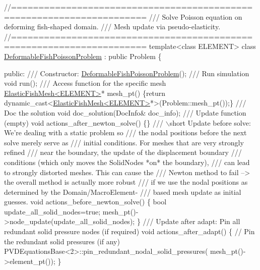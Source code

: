 \begin{DoxyCodeInclude}
\textcolor{comment}{//====================================================================== }\textcolor{comment}{}
\textcolor{comment}{/// Solve Poisson equation on deforming fish-shaped domain.}
\textcolor{comment}{/// Mesh update via pseudo-elasticity.}
\textcolor{comment}{}\textcolor{comment}{//====================================================================== }
\textcolor{keyword}{template}<\textcolor{keyword}{class} ELEMENT>
\textcolor{keyword}{class }\hyperlink{classDeformableFishPoissonProblem}{DeformableFishPoissonProblem} : \textcolor{keyword}{public} Problem
\{

\textcolor{keyword}{public}:
\textcolor{comment}{}
\textcolor{comment}{ /// Constructor:}
\textcolor{comment}{} \hyperlink{classDeformableFishPoissonProblem}{DeformableFishPoissonProblem}();
\textcolor{comment}{}
\textcolor{comment}{ /// Run simulation}
\textcolor{comment}{} \textcolor{keywordtype}{void} run();
 \textcolor{comment}{}
\textcolor{comment}{ /// Access function for the specific mesh}
\textcolor{comment}{} \hyperlink{classElasticFishMesh}{ElasticFishMesh<ELEMENT>}* mesh\_pt() 
  \{\textcolor{keywordflow}{return} \textcolor{keyword}{dynamic\_cast<}\hyperlink{classElasticFishMesh}{ElasticFishMesh<ELEMENT>}*\textcolor{keyword}{>}(Problem::mesh\_pt());\} 
\textcolor{comment}{}
\textcolor{comment}{ /// Doc the solution}
\textcolor{comment}{} \textcolor{keywordtype}{void} doc\_solution(DocInfo& doc\_info);
\textcolor{comment}{}
\textcolor{comment}{ /// Update function (empty)}
\textcolor{comment}{} \textcolor{keywordtype}{void} actions\_after\_newton\_solve() \{\}
\textcolor{comment}{}
\textcolor{comment}{ /// \(\backslash\)short Update before solve: We're dealing with a static problem so}
\textcolor{comment}{ /// the nodal positions before the next solve merely serve as}
\textcolor{comment}{ /// initial conditions. For meshes that are very strongly refined}
\textcolor{comment}{ /// near the boundary, the update of the displacement boundary}
\textcolor{comment}{ /// conditions (which only moves the SolidNodes *on* the boundary),}
\textcolor{comment}{ /// can lead to strongly distorted meshes. This can cause the}
\textcolor{comment}{ /// Newton method to fail --> the overall method is actually more robust}
\textcolor{comment}{ /// if we use the nodal positions as determined by the Domain/MacroElement-}
\textcolor{comment}{ /// based mesh update as initial guesses. }
\textcolor{comment}{} \textcolor{keywordtype}{void} actions\_before\_newton\_solve()
  \{ 
   \textcolor{keywordtype}{bool} update\_all\_solid\_nodes=\textcolor{keyword}{true};
   mesh\_pt()->node\_update(update\_all\_solid\_nodes);
  \}   
\textcolor{comment}{}
\textcolor{comment}{ /// Update after adapt: Pin all redundant solid pressure nodes (if required)}
\textcolor{comment}{} \textcolor{keywordtype}{void} actions\_after\_adapt()
  \{ 
   \textcolor{comment}{// Pin the redundant solid pressures (if any)}
   PVDEquationsBase<2>::pin\_redundant\_nodal\_solid\_pressures(
    mesh\_pt()->element\_pt());
  \}


\end{DoxyCodeInclude}
